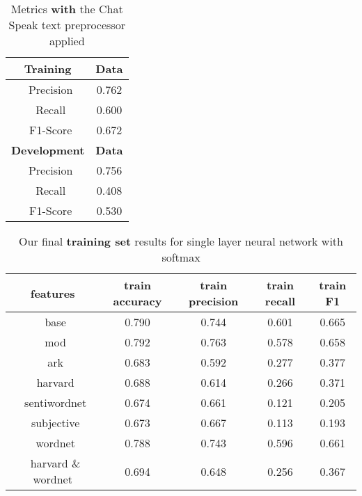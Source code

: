 \documentclass[11pt,letterpaper]{article}
\begin{document}
\begin{table}[htp]
\begin{center}
\begin{tabularx}{111pt}{|c|c|}
\hline
\bf Training & \bf Data \\ 
\hline
\ Precision & 0.762 \\
\ Recall & 0.600 \\
\ F1-Score & 0.672 \\
\hline
\bf Development & \bf Data \\ 
\hline
\ Precision & 0.756 \\
\ Recall & 0.408 \\
\ F1-Score & 0.530 \\
\hline
\end{tabularx}
\end{center}
\caption{\label{chatspeak-with-table} Metrics {\bf with} the Chat Speak text preprocessor applied }
\end{table}

\clearpage

\begin{table}[htp]
\begin{center}
\begin{tabularx}{374pt}{|c|c|c|c|c|}
\hline
\bf features & \bf train accuracy & \bf train precision &\bf train recall &\bf train F1 \\
\hline
\ base & 0.790 & 0.744 & 0.601 & 0.665 \\
\ mod & 0.792 & 0.763 & 0.578 & 0.658 \\
\ ark & 0.683 & 0.592 & 0.277 & 0.377 \\
\ harvard & 0.688 & 0.614 & 0.266 & 0.371 \\
\ sentiwordnet & 0.674 & 0.661 & 0.121 & 0.205 \\
\ subjective & 0.673 & 0.667 & 0.113 & 0.193 \\
\ wordnet & 0.788 & 0.743 & 0.596 & 0.661 \\
\ harvard \& wordnet & 0.694 & 0.648 & 0.256 & 0.367 \\
\hline
\end{tabularx}
\end{center}
\caption{\label{final-results-train} Our final {\bf training set} results for single layer neural network with softmax }
\end{table}
\end{document}
